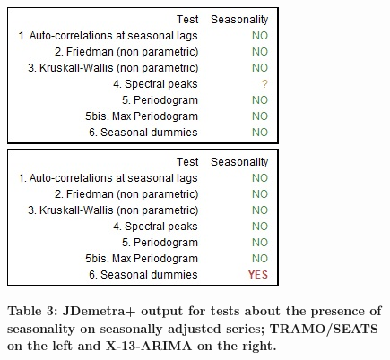 \documentclass{article}
\begin{document}
\begin{figure}[H]
  \begin{minipage}[b]{0.5\textwidth}
    \includegraphics[width=\textwidth]{../images/capitolo4/testTS.jpg}
  \end{minipage}
  \hfill
  \begin{minipage}[b]{0.5\textwidth}
    \includegraphics[width=\textwidth]{../images/capitolo4/testX13.jpg}
  \end{minipage}
  {\textbf{\scriptsize Table 3: JDemetra+ output for tests about the presence of seasonality on seasonally adjusted series; TRAMO/SEATS on the left and X-13-ARIMA on the right.}}
\end{figure}
\end{document}
